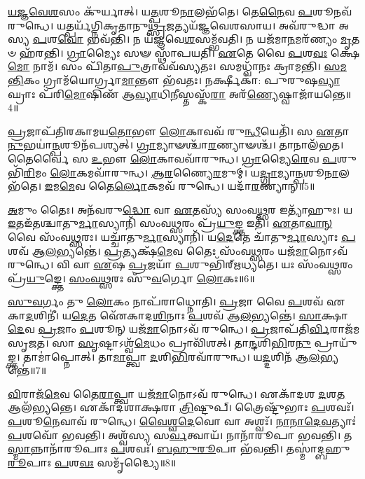 \-\ul{𑌯}\-\-\ul{𑌜𑍍𑌞}\-\-\ul{𑌵𑍇}\-\-\ul{𑌶}\-𑌸𑌂 𑌕𑍁᳴𑌰𑍍𑌯𑌾𑌤𑍍।
𑌯\-\ul{𑌤𑍍𑌪}\-𑌶𑍂\-\ul{𑌨𑌾}\-𑌲𑌭᳴𑌤𑍇।
𑌤𑍇\-\ul{𑌨𑍈}\-𑌵 \ul{𑌪}\-𑌶𑍂𑌨𑌵᳴ 𑌰𑍁𑌨𑍍𑌧𑍇।
𑌯𑌤𑍍𑌪𑌰𑍍𑌯᳴𑌗𑍍𑌨𑌿𑌕𑍃𑌤𑌾𑌨𑍁\-\ul{𑌥𑍍𑌸𑍃}\-𑌜𑌤𑍍𑌯𑌯᳴𑌜𑍍𑌞𑌵𑍇𑌶𑌸𑌾𑌯।
𑌅𑌵᳴𑌰𑍁𑌦𑍍𑌧𑌾 𑌅𑌸𑍍𑌯 \ul{𑌪}\-𑌶\-\ul{𑌵𑍋} 𑌭𑌵᳴𑌨𑍍𑌤𑌿।
𑌨 𑌯᳴𑌜𑍍𑌞𑌵𑍇\-\ul{𑌶}\-𑌸𑌮𑍍𑌭᳴𑌵𑌤𑌿।
𑌨 𑌯𑌜᳴𑌮𑌾\-\ul{𑌨}\-𑌮𑌰᳴𑌣𑍍𑌯𑌂 \ul{𑌮𑍃}\-𑌤𑍞 𑌹᳴𑌰𑌨𑍍𑌤𑌿।
\-\ul{𑌗𑍍𑌰𑌾}\-𑌮𑍍𑌯𑍈𑌃 𑌸𑍟 𑌸𑍍𑌥𑌾᳴𑌪𑌯𑌤𑌿।
\-\ul{𑌏}\-𑌤𑍇 𑌵𑍈 \ul{𑌪}\-𑌶\-\ul{𑌵𑌃} 𑌕𑍍𑌷𑍇\-\ul{𑌮𑍋} 𑌨𑌾𑌮᳴।
𑌸𑌂 𑌪𑌿᳴𑌤𑌾\-\ul{𑌪𑍁}\-𑌤𑍍𑌰𑌾𑌵𑌵᳴𑌸𑍍𑌯𑌤𑌃।
𑌸𑌮𑌧𑍍𑌵𑌾᳴𑌨𑌃 𑌕𑍍𑌰𑌾𑌮𑌨𑍍𑌤𑌿।
\-\ul{𑌸}\-\-\ul{𑌮}\-\-\ul{𑌨𑍍𑌤𑌿}\-𑌕𑌂 𑌗𑍍𑌰𑌾𑌮᳴𑌯𑍋𑌰𑍍𑌗𑍍𑌰𑌾\-\ul{𑌮𑌾}\-𑌨𑍍𑌤𑍗 𑌭᳴𑌵𑌤𑌃।
𑌨𑌰𑍍𑌕𑍍𑌷𑍀𑌕𑌾॑: 𑌪𑍁𑌰𑍁𑌷\-\ul{𑌵𑍍𑌯𑌾}\-𑌘𑍍𑌰𑌾𑌃 𑌪᳴𑌰𑌿\-\ul{𑌮𑍋}\-𑌷𑌿𑌣᳴ 𑌆\-\ul{𑌵𑍍𑌯𑌾}\-𑌧𑌿\-\ul{𑌨𑍀}\-𑌸𑍍𑌤𑌸𑍍𑌕᳴\-\ul{𑌰𑌾} 𑌅𑌰᳴\-\ul{𑌣𑍍𑌯𑍇}\-𑌷𑍍𑌵𑌾𑌜𑌾᳴𑌯𑌨𑍍𑌤𑍇॥4॥\anuvakamend[\-\ul{𑌋}\-𑌤𑌵𑌃᳴ 𑌸𑍍𑌯𑌾𑌤𑌾𑌮𑍁\-\ul{𑌥𑍍𑌸𑍃}\-𑌜𑍇𑌥𑍍𑌸𑍍𑌯᳴\-\ul{𑌤}\-𑌸𑍍𑌤𑍍𑌰𑍀𑌣𑌿᳴ 𑌚]

\-\ul{𑌪𑍍𑌰}\-𑌜𑌾𑌪᳴𑌤𑌿𑌰𑌕𑌾𑌮𑌯\-\ul{𑌤𑍋}\-𑌭𑍗 \ul{𑌲𑍋}\-𑌕𑌾𑌵𑌵᳴ 𑌰𑍁\-\ul{𑌨𑍍𑌧𑍀}\-𑌯𑍇𑌤𑌿᳴।
𑌸 \ul{𑌏}\-𑌤𑌾\-\ul{𑌨𑍁}\-𑌭𑌯𑌾॑\-\ul{𑌨𑍍𑌪}\-𑌶𑍂𑌨᳴𑌪𑌶𑍍𑌯𑌤𑍍।
\-\ul{𑌗𑍍𑌰𑌾}\-𑌮𑍍𑌯𑌾𑍟𑌶𑍍𑌚𑌾᳴\-\ul{𑌰}\-𑌣𑍍𑌯𑌾𑍟𑌶𑍍𑌚᳴।
𑌤𑌾𑌨𑌾𑌲᳴𑌭𑌤।
𑌤𑍈𑌰𑍍𑌵𑍈 𑌸 \ul{𑌉}\-𑌭𑍗 \ul{𑌲𑍋}\-𑌕𑌾𑌵𑌵𑌾᳴𑌰𑍁𑌨𑍍𑌧।
\-\ul{𑌗𑍍𑌰𑌾}\-𑌮𑍍𑌯𑍈\-\ul{𑌰𑍇}\-𑌵 \ul{𑌪}\-𑌶𑍁𑌭𑌿᳴\-\ul{𑌰𑌿}\-𑌮𑌂 \ul{𑌲𑍋}\-𑌕𑌮𑌵𑌾᳴𑌰𑍁𑌨𑍍𑌧।
\-\ul{𑌆}\-\-\ul{𑌰}\-𑌣𑍍𑌯𑍈\-\ul{𑌰}\-𑌮𑍁𑌮𑍍।
𑌯\-\ul{𑌦𑍍𑌗𑍍𑌰𑌾}\-𑌮𑍍𑌯𑌾\-\ul{𑌨𑍍𑌪}\-𑌶𑍂\-\ul{𑌨𑌾}\-𑌲𑌭᳴𑌤𑍇।
\-\ul{𑌇}\-𑌮\-\ul{𑌮𑍇}\-𑌵 𑌤𑍈\-\ul{𑌰𑍍𑌲𑍋}\-𑌕𑌮𑌵᳴ 𑌰𑍁𑌨𑍍𑌧𑍇।
𑌯𑌦𑌾᳴\-\ul{𑌰}\-𑌣𑍍𑌯𑌾𑌨𑍍॥5॥

\-\ul{𑌅}\-𑌮𑍁𑌂 𑌤𑍈𑌃।
𑌅𑌨᳴𑌵𑌰𑍁\-\ul{𑌦𑍍𑌧𑍋} 𑌵𑌾 \ul{𑌏}\-𑌤𑌸𑍍𑌯᳴ 𑌸𑌂𑌵\-\ul{𑌥𑍍𑌸}\-𑌰 𑌇𑌤𑍍𑌯𑌾᳴𑌹𑍁𑌃।
𑌯 \ul{𑌇}\-𑌤𑌇᳴𑌤𑌶𑍍𑌚𑌾𑌤𑍁\-\ul{𑌰𑍍𑌮𑌾}\-𑌸𑍍𑌯𑌾𑌨𑌿᳴ 𑌸𑌂𑌵\-\ul{𑌥𑍍𑌸}\-𑌰𑌂 𑌪𑍍𑌰᳴\-\ul{𑌯𑍁}\-𑌙𑍍𑌕𑍍𑌤 𑌇𑌤𑌿᳴।
\-\ul{𑌏}\-𑌤𑌾\-\ul{𑌵𑌾}\-\-\ul{𑌨𑍍} 𑌵𑍈 𑌸𑌂᳴𑌵\-\ul{𑌥𑍍𑌸}\-𑌰𑌃।
𑌯𑌚𑍍𑌚𑌾᳴𑌤𑍁\-\ul{𑌰𑍍𑌮𑌾}\-𑌸𑍍𑌯𑌾𑌨𑌿᳴।
𑌯\-\ul{𑌦𑍇}\-𑌤𑍇 𑌚𑌾᳴𑌤𑍁\-\ul{𑌰𑍍𑌮𑌾}\-𑌸𑍍𑌯𑌾𑌃 \ul{𑌪}\-𑌶𑌵᳴ 𑌆\-\ul{𑌲}\-𑌭𑍍𑌯𑌨𑍍𑌤𑍇॑।
\-\ul{𑌪𑍍𑌰}\-𑌤𑍍𑌯𑌕𑍍𑌷᳴\-\ul{𑌮𑍇}\-𑌵 𑌤𑍈𑌃 𑌸𑌂᳴𑌵\-\ul{𑌥𑍍𑌸}\-𑌰𑌂 𑌯𑌜᳴\-\ul{𑌮𑌾}\-𑌨𑍋\-𑌽𑌵᳴ 𑌰𑍁𑌨𑍍𑌧𑍇।
𑌵𑌿 𑌵𑌾 \ul{𑌏}\-𑌷 \ul{𑌪𑍍𑌰}\-𑌜𑌯𑌾᳴ \ul{𑌪}\-𑌶𑍁𑌭𑌿᳴𑌰𑍍‌\mbox{}𑌋𑌧𑍍𑌯𑌤𑍇।
𑌯𑌃 𑌸𑌂᳴𑌵\-\ul{𑌥𑍍𑌸}\-𑌰𑌂 𑌪𑍍𑌰᳴\-\ul{𑌯𑍁}\-𑌙𑍍𑌕𑍍𑌤𑍇।
\-\ul{𑌸𑌂}\-\-\ul{𑌵}\-\-\ul{𑌥𑍍𑌸}\-𑌰𑌃 𑌸𑍁᳴\-\ul{𑌵}\-𑌰𑍍𑌗𑍋 \ul{𑌲𑍋}\-𑌕𑌃॥6॥

\-\ul{𑌸𑍁}\-\-\ul{𑌵}\-𑌰𑍍𑌗𑌂 𑌤𑍁 \ul{𑌲𑍋}\-𑌕𑌂 𑌨𑌾𑌪᳴𑌰𑌾𑌧𑍍𑌨𑍋𑌤𑌿।
\-\ul{𑌪𑍍𑌰}\-𑌜𑌾 𑌵𑍈 \ul{𑌪}\-𑌶𑌵᳴ 𑌏𑌕𑌾\-\ul{𑌦}\-𑌶𑌿𑌨𑍀॑।
𑌯\-\ul{𑌦𑍇}\-𑌤 𑌐᳴𑌕𑌾𑌦\-\ul{𑌶𑌿}\-𑌨𑌾𑌃 \ul{𑌪}\-𑌶𑌵᳴ 𑌆\-\ul{𑌲}\-𑌭𑍍𑌯𑌨𑍍𑌤𑍇॑।
\-\ul{𑌸𑌾}\-𑌕𑍍𑌷𑌾\-\ul{𑌦𑍇}\-𑌵 \ul{𑌪𑍍𑌰}\-𑌜𑌾𑌂 \ul{𑌪}\-𑌶𑍂𑌨𑍍 𑌯𑌜᳴\-\ul{𑌮𑌾}\-𑌨𑍋\-𑌽𑌵᳴ 𑌰𑍁𑌨𑍍𑌧𑍇।
\-\ul{𑌪𑍍𑌰}\-𑌜𑌾𑌪᳴𑌤𑌿\-\ul{𑌰𑍍𑌵𑌿}\-𑌰𑌾𑌜᳴𑌮\-𑌸𑍃𑌜𑌤।
𑌸𑌾 \ul{𑌸𑍃}\-𑌷𑍍𑌟𑌾\-𑌽𑌶𑍍𑌵᳴\-\ul{𑌮𑍇}\-𑌧𑌂 𑌪𑍍𑌰𑌾𑌵𑌿᳴𑌶𑌤𑍍।
𑌤𑌾\-\ul{𑌨𑍍𑌦}\-𑌶𑌿\-\ul{𑌭𑌿}\-𑌰\-\ul{𑌨𑍁}\- 𑌪𑍍𑌰𑌾𑌯𑍁᳴𑌙𑍍𑌕𑍍𑌤।
𑌤𑌾𑌮𑌾॑𑌪𑍍𑌨𑍋𑌤𑍍।
𑌤𑌾\-\ul{𑌮𑌾}\-𑌪𑍍𑌤𑍍𑌵𑌾 \ul{𑌦}\-𑌶𑌿\-\ul{𑌭𑌿}\-𑌰𑌵𑌾᳴𑌰𑍁𑌨𑍍𑌧।
𑌯\-\ul{𑌦𑍍𑌦}\-𑌶𑌿𑌨᳴ 𑌆\-\ul{𑌲}\-𑌭𑍍𑌯𑌨𑍍𑌤𑍇॑॥7॥

\-\ul{𑌵𑌿}\-𑌰𑌾𑌜᳴\-\ul{𑌮𑍇}\-𑌵 𑌤𑍈\-\ul{𑌰𑌾}\-𑌪𑍍𑌤𑍍𑌵𑌾 𑌯𑌜᳴\-\ul{𑌮𑌾}\-𑌨𑍋\-𑌽𑌵᳴ 𑌰𑍁𑌨𑍍𑌧𑍇।
𑌏𑌕𑌾᳴𑌦𑌶 \ul{𑌦}\-𑌶\-\ul{𑌤} 𑌆𑌲᳴𑌭𑍍𑌯𑌨𑍍𑌤𑍇।
𑌏𑌕𑌾᳴𑌦𑌶𑌾𑌕𑍍𑌷𑌰𑌾 \ul{𑌤𑍍𑌰𑌿}\-𑌷𑍍𑌟𑍁𑌪𑍍।
𑌤𑍍𑌰𑍈𑌷𑍍𑌟𑍁᳴𑌭𑌾𑌃 \ul{𑌪}\-𑌶𑌵𑌃᳴।
\-\ul{𑌪}\-𑌶𑍂\-\ul{𑌨𑍇}\-𑌵𑌾𑌵᳴ 𑌰𑍁𑌨𑍍𑌧𑍇।
\-\ul{𑌵𑍈}\-\-\ul{𑌶𑍍𑌵}\-\-\ul{𑌦𑍇}\-𑌵𑍋 𑌵𑌾 𑌅𑌶𑍍𑌵𑌃᳴।
\-\ul{𑌨𑌾}\-\-\ul{𑌨𑌾}\-\-\ul{𑌦𑍇}\-\-\ul{𑌵}\-𑌤𑍍𑌯𑌾𑌃॑ \ul{𑌪}\-𑌶𑌵𑍋᳴ 𑌭𑌵𑌨𑍍𑌤𑌿।
𑌅𑌶𑍍𑌵᳴𑌸𑍍𑌯 𑌸\-\ul{𑌰𑍍𑌵}\-𑌤𑍍𑌵𑌾𑌯᳴।
𑌨𑌾𑌨𑌾᳴𑌰𑍂𑌪𑌾 𑌭𑌵𑌨𑍍𑌤𑌿।
𑌤\-\ul{𑌸𑍍𑌮𑌾}\-𑌨𑍍𑌨𑌾𑌨𑌾᳴𑌰𑍂𑌪𑌾𑌃 \ul{𑌪}\-𑌶𑌵𑌃᳴।
\-\ul{𑌬}\-\-\ul{𑌹𑍁}\-\-\ul{𑌰𑍂}\-𑌪𑌾 𑌭᳴𑌵𑌨𑍍𑌤𑌿।
𑌤𑌸𑍍𑌮𑌾॑𑌦𑍍𑌬𑌹𑍁\-\ul{𑌰𑍂}\-𑌪𑌾𑌃 \ul{𑌪}\-𑌶\-\ul{𑌵𑌃} 𑌸𑌮𑍃᳴𑌦𑍍𑌧𑍍𑌯𑍈॥8॥\anuvakamend[\-\ul{𑌆}\-\-\ul{𑌰}\-𑌣𑍍𑌯𑌾𑌁\-\ul{𑌲𑍍𑌲𑍋}\-𑌕𑍋 \ul{𑌦}\-𑌶𑌿𑌨᳴ 𑌆\-\ul{𑌲}\-𑌭𑍍𑌯\-\ul{𑌨𑍍𑌤𑍇} 𑌨𑌾𑌨𑌾᳴𑌰𑍂𑌪𑌾𑌃 \ul{𑌪}\-𑌶\-\ul{𑌵𑍋} 𑌦𑍍𑌵𑍇 𑌚᳴]

